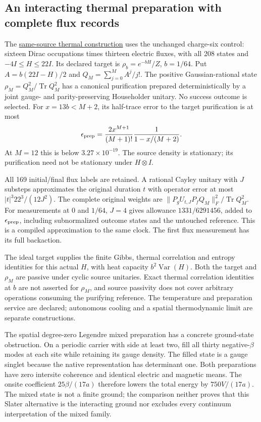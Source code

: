 \subsection{An interacting thermal preparation with complete flux records}

The \href{https://github.com/FloatingPragma/observer-patch-holography/blob/main/model/particle_field_state_response/PROOF.md}{same-source thermal construction}
uses the unchanged charge-six control: sixteen Dirac occupations times
thirteen electric fluxes, with all 208 states and $-4I\le H\le22I$.
Its declared target is $\rho_b=e^{-bH}/Z$, $b=1/64$. Put
$A=b(22I-H)/2$ and $Q_M=\sum_{j=0}^M A^j/j!$. The positive Gaussian-rational
state $\rho_M=Q_M^2/\operatorname{Tr}Q_M^2$ has a canonical
purification prepared deterministically by a joint gauge- and
parity-preserving Householder unitary. No success outcome is selected.
For $x=13b<M+2$, its half-trace error to the target purification is
at most
\[
 \epsilon_{\rm prep}=\frac{2x^{M+1}}{(M+1)!}
                      \frac1{1-x/(M+2)}.
\]
At $M=12$ this is below $3.27\times10^{-19}$. The source density is
stationary; its purification need not be stationary under $H\otimes I$.

All 169 initial/final flux labels are retained. A rational Cayley
unitary with $J$ substeps approximates the original duration $t$ with
operator error at most $|t|^3 22^3/(12J^2)$. The complete original
weights are
$\|P_gU_{t,J}P_fQ_M\|_F^2/\operatorname{Tr}Q_M^2$.
For measurements at $0$ and $1/64$, $J=4$ gives allowance
$1331/6291456$, added to $\epsilon_{\rm prep}$, including subnormalized
outcome states and the untouched reference. This is a compiled approximation
to the same clock. The first flux measurement has its full backaction.

The ideal target supplies the finite Gibbs, thermal correlation and
entropy identities for this actual $H$, with heat capacity
$b^2\operatorname{Var}(H)$. Both the target and $\rho_M$ are passive
under cyclic source unitaries. Exact thermal correlation identities
at $b$ are not asserted for $\rho_M$, and source passivity does not
cover arbitrary operations consuming the purifying reference.
The temperature and preparation service are declared; autonomous
cooling and a spatial thermodynamic limit are separate constructions.

The spatial degree-zero Legendre mixed preparation has a concrete ground-state
obstruction. On a periodic carrier with side at least two, fill all
thirty negative-$\beta$ modes at each site while retaining its gauge
density. The filled state is a gauge singlet because the native
representation has determinant one. Both preparations have zero
intersite coherence and identical electric and magnetic means. The
onsite coefficient $25\beta/(17a)$ therefore lowers the total energy
by $750V/(17a)$. The mixed state is not a finite ground; the comparison
neither proves that this Slater alternative is the interacting ground
nor excludes every continuum interpretation of the mixed family.

